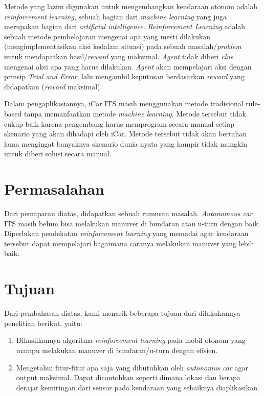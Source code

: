 Metode yang lazim digunakan untuk mengembangkan kendaraan otonom adalah \textit{reinforcement learning}, sebuah bagian dari \textit{machine learning }yang juga merupakan bagian dari \textit{artificial intelligence}. \textit{Reinforcement Learning }adalah sebuah metode pembelajaran mengenai apa yang mesti dilakukan (mengimplementasikan aksi kedalam situasi) pada sebuah masalah/\textit{problem }untuk mendapatkan hasil/\textit{reward }yang maksimal. \textit{Agent }tidak diberi \textit{clue }mengenai aksi apa yang harus dilakukan. \textit{Agent }akan mempelajari aksi dengan prinsip \textit{Trial and Error}, lalu mengambil keputusan berdasarkan \textit{reward }yang didapatkan (\textit{reward }maksimal).

Dalam pengaplikasiannya, iCar ITS masih menggunakan metode tradisional rule-based tanpa memanfaatkan metode \textit{machine learning}. Metode tersebut tidak cukup baik karena pengembang harus memprogram secara manual setiap skenario yang akan dihadapi oleh iCar. Metode tersebut tidak akan bertahan lama mengingat banyaknya skenario dunia nyata yang hampir tidak mungkin untuk diberi solusi secara manual.

\section{Permasalahan}
\label{sec:permasalahan}

Dari pemaparan diatas, didapatkan sebuah rumusan masalah. \textit{Autonomous car }ITS masih belum bisa melakukan manuver di bundaran atau u-turn dengan baik. Diperlukan pendekatan \textit{reinforcement learning }yang memadai agar kendaraan tersebut dapat mempelajari bagaimana caranya melakukan manuver yang lebih baik.
	


\section{Tujuan}
\label{sec:Tujuan}

Dari pembahasan diatas, kami menarik beberapa tujuan dari dilakukannya penelitian berikut, yaitu:
\begin{enumerate}[nolistsep]
	\item Dihasilkannya algoritma \textit{reinforcement learning }pada mobil otonom yang mampu melakukan manuver di bundaran/u-turn dengan efisien.
	\item Mengetahui fitur-fitur apa saja yang dibutuhkan oleh \textit{autonomus car }agar output maksimal. Dapat dicontohkan seperti dimana lokasi dan berapa derajat kemiringan dari sensor pada kendaraan yang sebaiknya diaplikasikan.
	
\end{enumerate}



